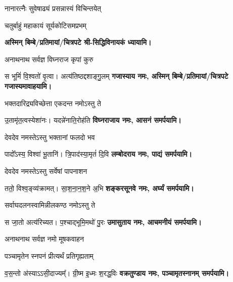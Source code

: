 \begin{center}

{नानारत्नैः सुवेषाढ्यं प्रसन्नास्यं विचिन्तयेत्}

{चतुर्बाहुं महाकायं सूर्यकोटिसमप्रभम्}

\textbf{अस्मिन् बिम्बे/प्रतिमायां/चित्रपटे श्री-सिद्धिविनायकं ध्यायामि।}

{अनाथनाथ सर्वज्ञ विघ्नराज कृपां कुरु}

{स भूमिं॑ वि॒श्वतो॑ वृ॒त्वा। अत्य॑तिष्ठद्दशाङ्गु॒लम्}
\textbf{गजास्याय नमः, अस्मिन् बिम्बे/प्रतिमायां/चित्रपटे गजास्यमावाहयामि।}
\medskip

{भक्तदारिद्र्यविच्छेत्ता एकदन्त नमोऽस्तु ते}

{उ॒तामृ॑त॒त्वस्येशा॑नः। यदन्ने॑नाति॒रोह॑ति}
\textbf{विघ्नराजाय नमः, आसनं समर्पयामि।}
\medskip

{देवदेव नमस्तेऽस्तु भक्तानां फलदो भव}

{पादो᳚ऽस्य॒ विश्वा॑ भू॒तानि॑। त्रि॒पाद॑स्या॒मृतं॑ दि॒वि}
\textbf{लम्बोदराय नमः, पाद्यं समर्पयामि।}
\medskip

{देवदेव नमस्तेऽस्तु सर्वेषां पापनाशन}

{ततो॒ विश्व॒ङ्व्य॑क्रामत्। सा॒श॒ना॒न॒श॒ने अ॒भि}
\textbf{शङ्करसूनवे नमः, अर्घ्यं समर्पयामि।}
\medskip

{सर्वाघदलनस्वामिन्नीलकण्ठ नमोऽस्तु ते}

{स जा॒तो अत्य॑रिच्यत। प॒श्चाद्भूमि॒मथो॑ पु॒रः}
\textbf{उमासुताय नमः, आचमनीयं समर्पयामि।}
\medskip

{अनाथनाथ सर्वज्ञ नमो मूषकवाहन}

{पञ्चामृतेन स्नपनं प्रीत्यर्थं प्रतिगृह्यताम्}

{व॒स॒न्तो अ॑स्याऽऽसी॒दाज्यम्᳚। ग्री॒ष्म इ॒ध्मः श॒रद्ध॒विः}
\textbf{वक्रतुण्डाय नमः, पञ्चामृतस्नानम् समर्पयामि।}
\medskip


\end{center}
